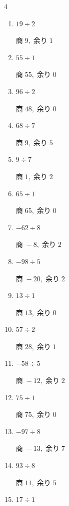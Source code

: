 \begin{multicols}{4}
\begin{enumerate}
        $商\; 23,\; 余り\; 2$

  \item $19 \div 2$

        $商\; 9,\; 余り\; 1$

  \item $55 \div 1$

        $商\; 55,\; 余り\; 0$

  \item $96 \div 2$

        $商\; 48,\; 余り\; 0$

  \item $68 \div 7$

        $商\; 9,\; 余り\; 5$

  \item $9 \div 7$

        $商\; 1,\; 余り\; 2$

  \item $65 \div 1$

        $商\; 65,\; 余り\; 0$

  \item $-62 \div 8$

        $商\; -8,\; 余り\; 2$

  \item $-98 \div 5$

        $商\; -20,\; 余り\; 2$

  \item $13 \div 1$

        $商\; 13,\; 余り\; 0$

  \item $57 \div 2$

        $商\; 28,\; 余り\; 1$

  \item $-58 \div 5$

        $商\; -12,\; 余り\; 2$

  \item $75 \div 1$

        $商\; 75,\; 余り\; 0$

  \item $-97 \div 8$

        $商\; -13,\; 余り\; 7$

\columnbreak %

\resetques

  \item $93 \div 8$

        $商\; 11,\; 余り\; 5$

  \item $17 \div 1$


\end{enumerate}
\end{multicols}
